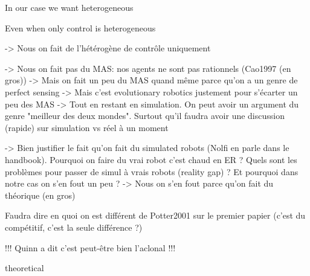     In our case we want heterogeneous

    Even when only control is heterogeneous

    -> Nous on fait de l'hétérogène de contrôle uniquement

    -> Nous on fait pas du MAS: nos agents ne sont pas rationnels (Cao1997 (en gros))
          -> Mais on fait un peu du MAS quand même parce qu'on a un genre de perfect sensing
          -> Mais c'est evolutionary robotics justement pour s'écarter un peu des MAS
          -> Tout en restant en simulation. On peut avoir un argument du genre "meilleur des deux mondes". Surtout qu'il faudra avoir une discussion (rapide) sur simulation vs réel à un moment

    -> Bien justifier le fait qu'on fait du simulated robots (Nolfi en parle dans le handbook). Pourquoi on faire du vrai robot c'est chaud en ER ? Quels sont les problèmes pour passer de simul à vrais robots (reality gap) ? Et pourquoi dans notre cas on s'en fout un peu ? 
          -> Nous on s'en fout parce qu'on fait du théorique (en gros)

    Faudra dire en quoi on est différent de Potter2001 sur le premier papier (c'est du compétitif, c'est la seule différence ?)

    !!! Quinn a dit c'est peut-être bien l'aclonal !!!

    theoretical
